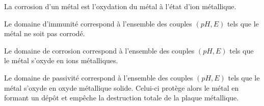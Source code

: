 \documentclass[a4paper]{article}
\begin{document}
\pagestyle{fancy}
\fancyhf{}
\setlength{\headheight}{15pt}

\begin{center}
	\large{}
\end{center}


La corrosion d’un métal est l’oxydation du métal à l’état d’ion métallique.

Le domaine d'immunité correspond à l'ensemble des couples \((pH,E)\) tels que le métal ne soit pas corrodé.

Le domaine de corrosion correspond à l'ensemble des couples \((pH,E)\) tels que le métal s'oxyde en ions métalliques.

Le domaine de passivité correspond à l'ensemble des couples \((pH,E)\) tels que le métal s'oxyde en oxyde métallique solide. Celui-ci protège alors le métal en formant un dépôt et empêche la destruction totale de la plaque métallique.
\end{document}
